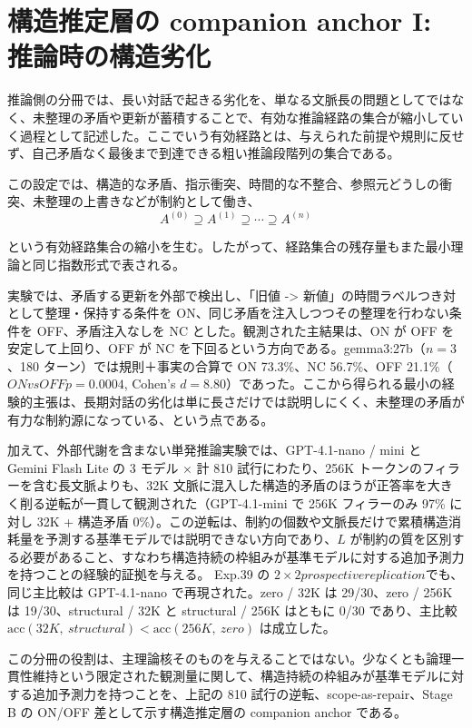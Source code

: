 \documentclass[12pt,a4paper]{article}
\begin{document}
\section{構造推定層の companion anchor I: 推論時の構造劣化}\label{ux69cbux9020ux63a8ux5b9aux5c64ux306e-companion-anchor-i-ux63a8ux8ad6ux6642ux306eux69cbux9020ux52a3ux5316}

推論側の分冊では、長い対話で起きる劣化を、単なる文脈長の問題としてではなく、未整理の矛盾や更新が蓄積することで、有効な推論経路の集合が縮小していく過程として記述した。ここでいう有効経路とは、与えられた前提や規則に反せず、自己矛盾なく最後まで到達できる粗い推論段階列の集合である。

この設定では、構造的な矛盾、指示衝突、時間的な不整合、参照元どうしの衝突、未整理の上書きなどが制約として働き、 \[
A^{(0)} \supseteq A^{(1)} \supseteq \cdots \supseteq A^{(n)}
\]

という有効経路集合の縮小を生む。したがって、経路集合の残存量もまた最小理論と同じ指数形式で表される。

実験では、矛盾する更新を外部で検出し、「旧値 -\textgreater{} 新値」の時間ラベルつき対として整理・保持する条件を ON、同じ矛盾を注入しつつその整理を行わない条件を OFF、矛盾注入なしを NC とした。観測された主結果は、ON が OFF を安定して上回り、OFF が NC を下回るという方向である。gemma3:27b（\(n=3\)、180 ターン）では規則＋事実の合算で ON 73.3\%、NC 56.7\%、OFF 21.1\%（\(ON vs OFF p = 0.0004\), Cohen's \(d = 8.80\)）であった。ここから得られる最小の経験的主張は、長期対話の劣化は単に長さだけでは説明しにくく、未整理の矛盾が有力な制約源になっている、という点である。

加えて、外部代謝を含まない単発推論実験では、GPT-4.1-nano / mini と Gemini Flash Lite の 3 モデル × 計 810 試行にわたり、256K トークンのフィラーを含む長文脈よりも、32K 文脈に混入した構造的矛盾のほうが正答率を大きく削る逆転が一貫して観測された（GPT-4.1-mini で 256K フィラーのみ 97\% に対し 32K + 構造矛盾 0\%）。この逆転は、制約の個数や文脈長だけで累積構造消耗量を予測する基準モデルでは説明できない方向であり、\(L\) が制約の質を区別する必要があること、すなわち構造持続の枠組みが基準モデルに対する追加予測力を持つことの経験的証拠を与える。 Exp.39 の \(2\times2 prospective replication\)でも、同じ主比較は GPT-4.1-nano で再現された。zero / 32K は 29/30、zero / 256K は 19/30、structural / 32K と structural / 256K はともに 0/30 であり、主比較 \(\mathrm{acc}(32K,\ structural) < \mathrm{acc}(256K,\ zero)\) は成立した。

この分冊の役割は、主理論核そのものを与えることではない。少なくとも論理一貫性維持という限定された観測量に関して、構造持続の枠組みが基準モデルに対する追加予測力を持つことを、上記の 810 試行の逆転、scope-as-repair、Stage B の ON/OFF 差として示す構造推定層の companion anchor である。
\end{document}
